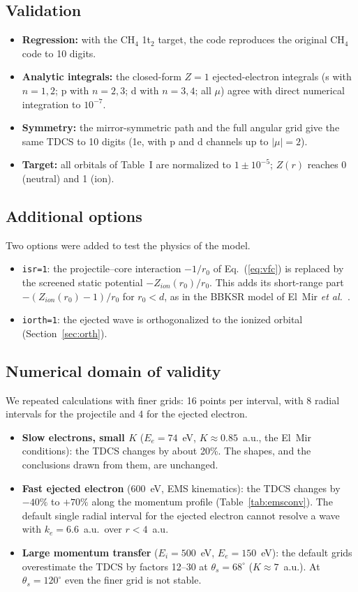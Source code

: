 \documentclass[11pt,a4paper]{article}
\newcommand{\CH}{CH$_4$}
\begin{document}
\subsection{Validation}
\begin{itemize}
\item \textbf{Regression:} with the \CH{} 1t$_2$ target, the code reproduces the original \CH{}
  code to 10 digits.
\item \textbf{Analytic integrals:} the closed-form $Z=1$ ejected-electron integrals (s with
  $n=1,2$; p with $n=2,3$; d with $n=3,4$; all $\mu$) agree with direct numerical integration to
  $10^{-7}$.
\item \textbf{Symmetry:} the mirror-symmetric path and the full angular grid give the same TDCS
  to 10 digits (1e, with p and d channels up to $|\mu|=2$).
\item \textbf{Target:} all orbitals of Table~I are normalized to $1\pm10^{-5}$; $Z(r)$ reaches 0
  (neutral) and 1 (ion).
\end{itemize}

\subsection{Additional options}
Two options were added to test the physics of the model.
\begin{itemize}
\item \texttt{isr=1}: the projectile--core interaction $-1/r_0$ of Eq.~(\ref{eq:vfc}) is replaced
  by the screened static potential $-Z_{ion}(r_0)/r_0$. This adds its short-range part
  $-(Z_{ion}(r_0)-1)/r_0$ for $r_0<d$, as in the BBKSR model of El~Mir
  \emph{et al.}~\cite{ElMir2020}.
\item \texttt{iorth=1}: the ejected wave is orthogonalized to the ionized orbital
  (Section~\ref{sec:orth}).
\end{itemize}

\subsection{Numerical domain of validity}\label{sec:conv}
We repeated calculations with finer grids: 16 points per interval, with 8 radial intervals for
the projectile and 4 for the ejected electron.

\begin{itemize}
\item \textbf{Slow electrons, small $K$} ($E_e=74$~eV, $K\approx0.85$~a.u., the El~Mir
  conditions): the TDCS changes by about 20\%. The shapes, and the conclusions drawn from them,
  are unchanged.
\item \textbf{Fast ejected electron} (600~eV, EMS kinematics): the TDCS changes by $-40\%$ to
  $+70\%$ along the momentum profile (Table~\ref{tab:emsconv}). The default single radial interval
  for the ejected electron cannot resolve a wave with $k_e=6.6$~a.u.\ over $r<4$~a.u.
\item \textbf{Large momentum transfer} ($E_i=500$~eV, $E_e=150$~eV): the default grids
  overestimate the TDCS by factors 12--30 at $\theta_s=68^\circ$ ($K\approx7$~a.u.). At
  $\theta_s=120^\circ$ even the finer grid is not stable.
\end{itemize}
\end{document}
